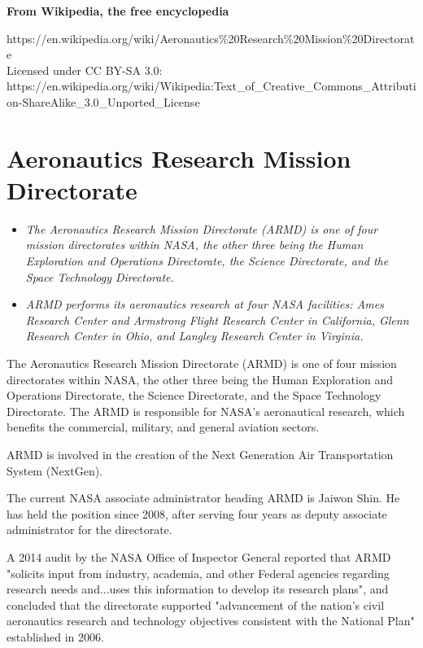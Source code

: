 \textbf{From Wikipedia, the free encyclopedia}

https://en.wikipedia.org/wiki/Aeronautics\%20Research\%20Mission\%20Directorate\\
Licensed under CC BY-SA 3.0:\\
https://en.wikipedia.org/wiki/Wikipedia:Text\_of\_Creative\_Commons\_Attribution-ShareAlike\_3.0\_Unported\_License

\section{Aeronautics Research Mission
Directorate}\label{aeronautics-research-mission-directorate}

\begin{itemize}
\item
  \emph{The Aeronautics Research Mission Directorate (ARMD) is one of
  four mission directorates within NASA, the other three being the Human
  Exploration and Operations Directorate, the Science Directorate, and
  the Space Technology Directorate.}
\item
  \emph{ARMD performs its aeronautics research at four NASA facilities:
  Ames Research Center and Armstrong Flight Research Center in
  California, Glenn Research Center in Ohio, and Langley Research Center
  in Virginia.}
\end{itemize}

The Aeronautics Research Mission Directorate (ARMD) is one of four
mission directorates within NASA, the other three being the Human
Exploration and Operations Directorate, the Science Directorate, and the
Space Technology Directorate. The ARMD is responsible for NASA's
aeronautical research, which benefits the commercial, military, and
general aviation sectors.

ARMD is involved in the creation of the Next Generation Air
Transportation System (NextGen).

The current NASA associate administrator heading ARMD is Jaiwon Shin. He
has held the position since 2008, after serving four years as deputy
associate administrator for the directorate.

A 2014 audit by the NASA Office of Inspector General reported that ARMD
"solicits input from industry, academia, and other Federal agencies
regarding research needs and...uses this information to develop its
research plans", and concluded that the directorate supported
"advancement of the nation's civil aeronautics research and technology
objectives consistent with the National Plan" established in 2006.

